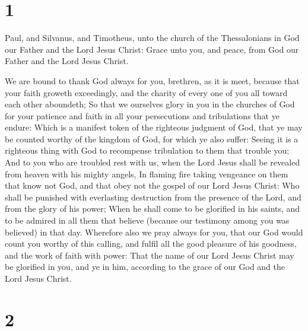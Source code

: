 \hypertarget{section}{%
\section{1}\label{section}}

 Paul, and Silvanus, and Timotheus, unto the church of the
Thessalonians in God our Father and the Lord Jesus Christ: 
Grace unto you, and peace, from God our Father and the Lord Jesus
Christ.

 We are bound to thank God always for you, brethren, as it
is meet, because that your faith groweth exceedingly, and the charity of
every one of you all toward each other aboundeth;  So that
we ourselves glory in you in the churches of God for your patience and
faith in all your persecutions and tribulations that ye endure:
 Which is a manifest token of the righteous judgment of God,
that ye may be counted worthy of the kingdom of God, for which ye also
suffer:  Seeing it is a righteous thing with God to
recompense tribulation to them that trouble you;  And to you
who are troubled rest with us, when the Lord Jesus shall be revealed
from heaven with his mighty angels,  In flaming fire taking
vengeance on them that know not God, and that obey not the gospel of our
Lord Jesus Christ:  Who shall be punished with everlasting
destruction from the presence of the Lord, and from the glory of his
power;  When he shall come to be glorified in his saints,
and to be admired in all them that believe (because our testimony among
you was believed) in that day.  Wherefore also we pray
always for you, that our God would count you worthy of this calling, and
fulfil all the good pleasure of his goodness, and the work of faith with
power:  That the name of our Lord Jesus Christ may be
glorified in you, and ye in him, according to the grace of our God and
the Lord Jesus Christ.

\hypertarget{section-1}{%
\section{2}\label{section-1}}

